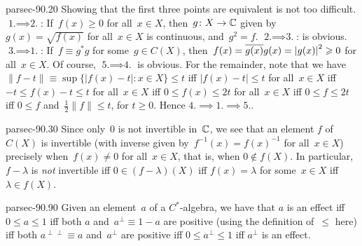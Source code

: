 \documentclass[b5page]{book}
\begin{document}
\begin{solution}{parsec-90.20}
Showing that the first three points are equivalent is not too difficult.
$\text{1.}\implies\text{2.}$:
    If~$f(x)\geq 0$ for all~$x\in X$,
    then~$g\colon X\to\C$ given by~$g(x)=\sqrt{f(x)}$
    for all~$x\in X$ is continuous,
    and~$g^2=f$.
$\text{2.}\implies\text{3.}$:
is obvious.
$\text{3.}\implies\text{1.}$:
If~$f\equiv g^*g$ for some~$g\in C(X)$,
    then~$f(x)=\smash{\overline{g(x)}}g(x)=\left|g(x)\right|^2\geq 0$
    for all~$x\in X$.
Of course,
$\text{5.}\implies \text{4.}$ is obvious.
For the remainder,
note that we have
    $\|f-t\|\equiv \sup\{\left|f(x)-t\right|\colon x\in X\}\leq t$
    iff $\left|f(x)-t\right|\leq t$ for all~$x\in X$
    iff $-t\leq f(x)-t \leq t $ for all~$x\in X$
    iff $0\leq f(x)\leq 2t$ for all~$x\in X$
    iff $0\leq f\leq 2t$
    iff $0\leq f$ and~$\frac{1}{2}\|f\|\leq t$,
    for $t\geq 0$.
Hence $\text{4.}\implies\text{1.}\implies\text{5.}$.
\end{solution}
\begin{solution}{parsec-90.30}
Since only~$0$ is not invertible in~$\C$,
    we see that an element $f$ of $C(X)$
    is invertible (with inverse given by~$f^{-1}(x)=f(x)^{-1}$ 
    for all~$x\in X$) precisely when~$f(x)\neq 0$ for all~$x\in X$,
    that is, when $0\notin f(X)$.
In particular,
    $f-\lambda $ is \emph{not} invertible
    iff $0\in (f-\lambda)(X)$
    iff $f(x)=\lambda$ for some~$x\in X$
    iff $\lambda \in f(X)$.
\end{solution}
\begin{solution}{parsec-90.90}
Given an element~$a$ of a $C^*$-algebra,
we have that
    $a$ is an effect iff $0\leq a\leq 1$
    iff both $a$ and~$a^\perp \equiv 1-a$ 
    are positive (using the definition of~$\leq$ here)
    iff both $a^{\perp\perp}\equiv a$ and~$a^\perp$ are positive
    iff $0\leq a^\perp\leq 1$
    iff $a^\perp$ is an effect.
\end{solution}
\end{document}

